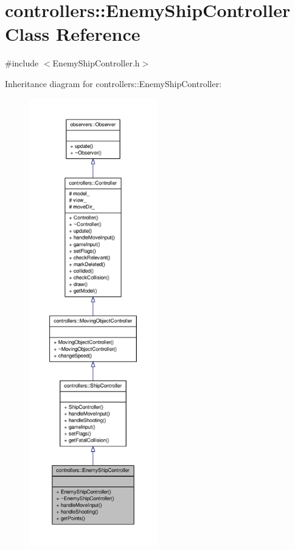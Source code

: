\hypertarget{classcontrollers_1_1EnemyShipController}{\section{controllers\-:\-:\-Enemy\-Ship\-Controller \-Class \-Reference}
\label{df/dd1/classcontrollers_1_1EnemyShipController}
}


{\ttfamily \#include $<$\-Enemy\-Ship\-Controller.\-h$>$}



\-Inheritance diagram for controllers\-:\-:\-Enemy\-Ship\-Controller\-:
\nopagebreak
\begin{figure}[H]
\begin{center}
\leavevmode
\includegraphics[height=550pt]{d7/ded/classcontrollers_1_1EnemyShipController__inherit__graph}
\end{center}
\end{figure}


